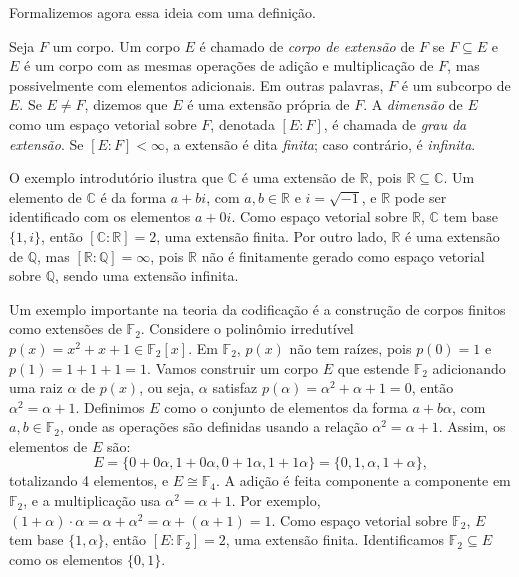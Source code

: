 Formalizemos agora essa ideia com uma definição.

\begin{definition}
  Seja $F$ um corpo. Um corpo $E$ é chamado de \emph{corpo de extensão} de $F$ se
  $F \subseteq E$ e $E$ é um corpo com as mesmas operações de adição e
  multiplicação de $F$, mas possivelmente com elementos adicionais. Em outras
  palavras, $F$ é um subcorpo de $E$. Se $E \neq F$, dizemos que $E$ é uma
  extensão própria de $F$. A \emph{dimensão} de $E$ como um espaço vetorial
  sobre $F$, denotada $[E : F]$, é chamada de \emph{grau da extensão}. Se $[E : F] < \infty$,
  a extensão é dita \emph{finita}; caso contrário, é \emph{infinita}.
\end{definition}

\begin{example}
  O exemplo introdutório ilustra que $\mathbb{C}$ é uma extensão de
  $\mathbb{R}$, pois $\mathbb{R} \subseteq \mathbb{C}$. Um elemento de
  $\mathbb{C}$ é da forma $a + bi$, com $a, b \in \mathbb{R}$ e $i = \sqrt{-1}$,
  e $\mathbb{R}$ pode ser identificado com os elementos $a + 0i$.
  Como espaço vetorial sobre $\mathbb{R}$, $\mathbb{C}$ tem base $\{1, i\}$,
  então $[\mathbb{C} : \mathbb{R}] = 2$, uma extensão finita. Por outro lado,
  $\mathbb{R}$ é uma extensão de $\mathbb{Q}$, mas $[\mathbb{R} : \mathbb{Q}] = \infty$,
  pois $\mathbb{R}$ não é finitamente gerado como espaço vetorial
  sobre $\mathbb{Q}$, sendo uma extensão infinita.
\end{example}


\begin{example}
  Um exemplo importante na teoria da codificação é a construção de corpos
  finitos como extensões de $\mathbb{F}_2$. Considere o polinômio
  irredutível $p(x) = x^2 + x + 1 \in \mathbb{F}_2[x]$. 
  Em $\mathbb{F}_2$, $p(x)$ não tem raízes, pois $p(0) = 1$ e 
  $p(1) = 1 + 1 + 1 = 1$. Vamos construir um corpo $E$ que
  estende $\mathbb{F}_2$ adicionando uma raiz $\alpha$ de $p(x)$,
  ou seja, $\alpha$ satisfaz $p(\alpha) = \alpha^2 + \alpha + 1 = 0$,
  então $\alpha^2 = \alpha + 1$. Definimos $E$ como o conjunto de
  elementos da forma $a + b \alpha$, com $a, b \in \mathbb{F}_2$, onde
  as operações são definidas usando a relação $\alpha^2 = \alpha + 1$.
  Assim, os elementos de $E$ são:
  \[
  E = \{ 0 + 0 \alpha, 1 + 0 \alpha, 0 + 1 \alpha, 1 + 1 \alpha \} = \{ 0, 1, \alpha, 1 + \alpha \},
  \]
  totalizando 4 elementos, e $E \cong \mathbb{F}_4$. A adição é feita
  componente a componente em $\mathbb{F}_2$, e a multiplicação usa $\alpha^2 = \alpha + 1$.
  Por exemplo, $(1 + \alpha) \cdot \alpha = \alpha + \alpha^2 = \alpha + (\alpha + 1) = 1$.
  Como espaço vetorial sobre $\mathbb{F}_2$, $E$
  tem base $\{1, \alpha\}$, então $[E : \mathbb{F}_2] = 2$, uma extensão
  finita. Identificamos $\mathbb{F}_2 \subseteq E$ como os elementos $\{0, 1\}$.
\end{example}

